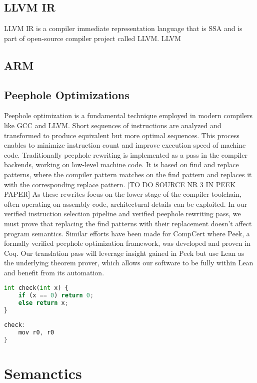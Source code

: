 \subsection{LLVM IR} 
LLVM IR is a compiler immediate representation language that is SSA and is part of open-source compiler project called LLVM. LLVM
\subsection{ARM} 
\subsection{Peephole Optimizations} 

Peephole optimization is a fundamental technique employed in modern compilers like GCC and LLVM. Short sequences of instructions are analyzed and transformed to produce equivalent but more optimal sequences. This process enables to minimize instruction count and improve execution speed of machine code. Traditionally peephole rewriting is implemented as a pass in the compiler backends, working on low-level machine code.  It is based on find and replace patterns, where the compiler pattern matches on the find pattern and replaces it with the corresponding replace pattern. [TO DO SOURCE NR 3 IN PEEK PAPER]  As these rewrites focus on the lower stage of the compiler toolchain, often operating  on assembly code,  architectural details can be exploited.  In our  verified instruction selection pipeline and verified  peephole rewriting pass,  we must prove that replacing the find patterns with their replacement doesn’t affect program semantics. Similar efforts have been made for CompCert where Peek, a formally verified peephole optimization framework, was developed and proven in Coq. Our translation pass will leverage insight gained in Peek but use Lean as the underlying theorem prover, which allows our software to be fully within Lean and benefit from its automation.

\noindent
\begin{minipage}{0.6\textwidth}
\begin{lstlisting}[language=Python, caption=unoptimized]
int check(int x) {						        
	if (x == 0) return 0; 					
    else return x;
}
\end{lstlisting}
\end{minipage}
\hfill
\begin{minipage}{0.45\textwidth}
\begin{lstlisting}[language=C, caption= optimzed assembly]
check: 
    mov r0, r0
}
\end{lstlisting}
\end{minipage}


\section {Semanctics}

